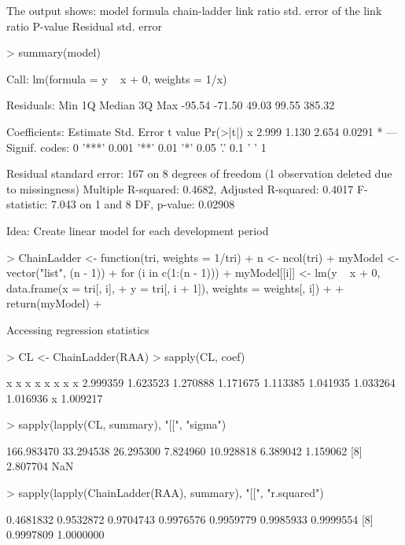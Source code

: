 \documentclass[a4paper]{article}
\begin{document}
The output shows:
model formula
chain-ladder link ratio
std. error of the link ratio
P-value
Residual std. error
\begin{Schunk}
\begin{Sinput}
> summary(model)
\end{Sinput}
\begin{Soutput}
Call:
lm(formula = y ~ x + 0, weights = 1/x)

Residuals:
   Min     1Q Median     3Q    Max 
-95.54 -71.50  49.03  99.55 385.32 

Coefficients:
  Estimate Std. Error t value Pr(>|t|)  
x    2.999      1.130   2.654   0.0291 *
---
Signif. codes:  0 '***' 0.001 '**' 0.01 '*' 0.05 '.' 0.1 ' ' 1 

Residual standard error: 167 on 8 degrees of freedom
  (1 observation deleted due to missingness)
Multiple R-squared: 0.4682,	Adjusted R-squared: 0.4017 
F-statistic: 7.043 on 1 and 8 DF,  p-value: 0.02908 
\end{Soutput}
\end{Schunk}
Idea: Create linear model for each development period
\begin{Schunk}
\begin{Sinput}
> ChainLadder <- function(tri, weights = 1/tri) {
+     n <- ncol(tri)
+     myModel <- vector("list", (n - 1))
+     for (i in c(1:(n - 1))) {
+         myModel[[i]] <- lm(y ~ x + 0, data.frame(x = tri[, i], 
+             y = tri[, i + 1]), weights = weights[, i])
+     }
+     return(myModel)
+ }
\end{Sinput}
\end{Schunk}
Accessing regression statistics
\begin{Schunk}
\begin{Sinput}
> CL <- ChainLadder(RAA)
> sapply(CL, coef)
\end{Sinput}
\begin{Soutput}
       x        x        x        x        x        x        x        x 
2.999359 1.623523 1.270888 1.171675 1.113385 1.041935 1.033264 1.016936 
       x 
1.009217 
\end{Soutput}
\begin{Sinput}
> sapply(lapply(CL, summary), "[[", "sigma")
\end{Sinput}
\begin{Soutput}
[1] 166.983470  33.294538  26.295300   7.824960  10.928818   6.389042   1.159062
[8]   2.807704        NaN
\end{Soutput}
\begin{Sinput}
> sapply(lapply(ChainLadder(RAA), summary), "[[", "r.squared")
\end{Sinput}
\begin{Soutput}
[1] 0.4681832 0.9532872 0.9704743 0.9976576 0.9959779 0.9985933 0.9999554
[8] 0.9997809 1.0000000
\end{Soutput}
\end{Schunk}
\end{document}
